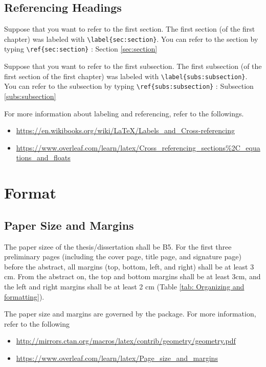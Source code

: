 \documentclass[11pt]{report}
\begin{document}
%
\section{Referencing Headings}\label{sec:referencing}
Suppose that you want to refer to the first section.
The first section (of the first chapter) was labeled with \verb|\label{sec:section}|.
You can refer to the section by typing \verb|\ref{sec:section}| : Section \ref{sec:section}

Suppose that you want to refer to the first subsection.
The first subsection (of the first section of the first chapter) was labeled with \verb|\label{subs:subsection}|.
You can refer to the subsection by typing \verb|\ref{subs:subsection}| : Subsection \ref{subs:subsection}

For more information about labeling and referencing, refer to the followings.
\begin{itemize}
\item
\url{https://en.wikibooks.org/wiki/LaTeX/Labels_and_Cross-referencing}
\item
\url{https://www.overleaf.com/learn/latex/Cross_referencing_sections%2C_equations_and_floats}
\end{itemize}

\chapter{Format}\label{chap:organizing}

\section{Paper Size and Margins} \label{sec:papersize}
The paper sizee of the thesis/dissertation shall be B5.
For the first three preliminary pages (including the cover page, title page, and signature page) before the abstract, all margins (top, bottom, left, and right) shall be at least 3 cm.
From the abstract on, the top and bottom margins shall be at least 3cm, and the left and right margins shall be at least 2 cm (Table \ref{tab: Organizing and formatting}).
\bigskip

The paper size and margins are governed by the  package.
For more information, refer to the following
\begin{itemize}
\item
\url{http://mirrors.ctan.org/macros/latex/contrib/geometry/geometry.pdf}
\item
\url{https://www.overleaf.com/learn/latex/Page_size_and_margins}
\end{itemize}
\end{document}
